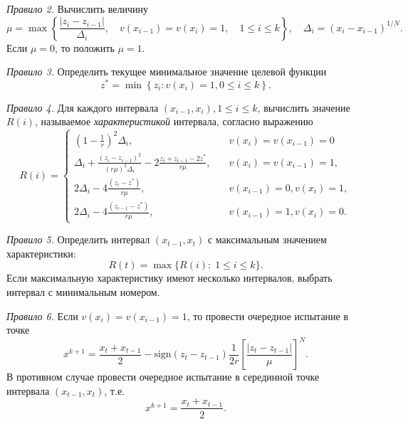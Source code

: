 \documentclass[10pt,a4paper]{book}
\begin{document}
\textit{Правило 2.} Вычислить величину
\begin{equation}\label{eq7} 
\mu = \max\left\{ \frac{|z_i-z_{i-1}|}{\Delta _i},\quad v(x_{i-1})=v(x_i)=1, \quad 1 \leq i \leq k  \right\},\quad \Delta _i= (x_i-x_{i-1})^{1/N}.
\end{equation}
Если $\mu=0$, то положить $\mu=1$.

\textit{Правило 3.} Определить текущее минимальное значение целевой функции
\begin{equation}\label{eq8} 
z^*= \min \left\{ z_i: v(x_i)=1, 0 \leq i \leq k \right\}.
\end{equation}

\textit{Правило 4.} Для каждого интервала $(x_{i-1},x_i),1 \leq i \leq k$, вычислить значение $R(i)$, называемое \textit{характеристикой} интервала, согласно выражению
\begin{equation}\label{eq9} 
R(i)=
  \begin{cases}
    {(1-\frac{1}{r})}^2 \Delta _i,& {\quad v(x_i)=v(x_{i-1})=0} \\
    \Delta _i+\frac {{(z_i-z_{i-1})}^2}{{(r \mu)}^2 \Delta _i} - 2 \frac {z_i+z_{i-1}-2z^*}{r \mu}, & {\quad  v(x_i)=v(x_{i-1})=1},\\
    2 \Delta _i-4 \frac {(z_i-z^*)}{r \mu}, & {\quad v(x_{i-1})=0, v(x_i)=1},\\
    2 \Delta _i-4 \frac {(z_{i-1}-z^*)}{r \mu}, & {\quad  v(x_{i-1})=1, v(x_i)=0.}
  \end{cases}
\end{equation}

\textit{Правило 5.} Определить интервал $(x_{t-1},x_t)$ с максимальным значением характеристики:
\[
R(t)= \max\{R(i): \; 1 \leq i \leq k\}.
\]
Если максимальную характеристику имеют несколько интервалов, выбрать интервал
с минимальным номером.

\textit{Правило 6.} Если $v(x_i)=v(x_{i-1})=1$, то провести очередное испытание в точке 
\begin{equation}\label{eq11} 
x^{k+1}= \frac {x_t+x_{t-1}}{2} -  \text{sign} {(z_t-z_{t-1})} \frac{1}{2r} \left[\frac {{|z_t-z_{t-1}|}}{\mu} \right]^N.
\end{equation}
В противном случае провести очередное испытание в серединной точке интервала $(x_{t-1},x_t)$, т.е.
\begin{equation}\label{eq10} 
x^{k+1}=\frac {x_t+x_{t-1}}{2}.
\end{equation}
\end{document}
